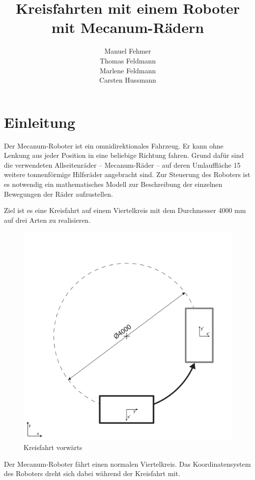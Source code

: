 \documentclass[a4paper]{article}
\title{Kreisfahrten mit einem Roboter mit Mecanum-Rädern}
\author{Manuel Fehmer \\ Thomas Feldmann \\ Marlene Feldmann \\ Carsten Hussmann}
\begin{document}
\maketitle
\newpage

\section{Einleitung}
Der Mecanum-Roboter ist ein omnidirektionales Fahrzeug. Er kann ohne Lenkung aus jeder Position in eine beliebige Richtung fahren. Grund dafür sind die verwendeten Allseitenräder -- Mecanum-Räder -- auf deren Umlauffläche 15 weitere tonnenförmige Hilfsräder angebracht sind. Zur Steuerung des Roboters ist es notwendig ein mathematisches Modell zur Beschreibung der einzelnen Bewegungen der Räder aufzustellen.

Ziel ist es eine Kreisfahrt auf einem Viertelkreis mit dem Durchmesser 4000 mm auf drei Arten zu realisieren.

\vspace{2cm}
\begin{figure}[H]
    \centering
    \includegraphics[width=.6\textwidth]{Viertelkreis-vorwaerts}
    \caption{Kreisfahrt vorwärts}
\end{figure}
Der Mecanum-Roboter fährt einen normalen Viertelkreis. Das Koordinatensystem des Roboters dreht sich dabei während der Kreisfahrt mit.
\end{document}
